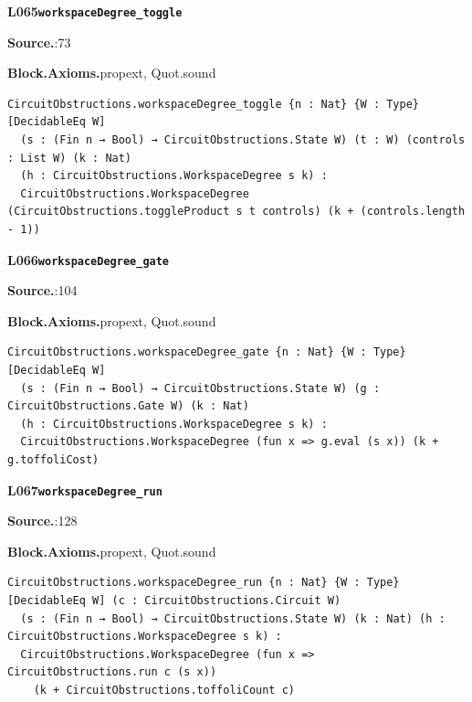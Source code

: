\par\medskip\noindent\begin{minipage}{\textwidth}
{\small\bfseries L065\enspace\texttt{workspaceDegree\_toggle}\par}
{\footnotesize\raggedright\textbf{Source.}\enspace{}:73\par
\textbf{Block.}\quad\textbf{Axioms.}\enspace propext, Quot.sound\par}\nopagebreak
\begin{lstlisting}
CircuitObstructions.workspaceDegree_toggle {n : Nat} {W : Type} [DecidableEq W]
  (s : (Fin n → Bool) → CircuitObstructions.State W) (t : W) (controls : List W) (k : Nat)
  (h : CircuitObstructions.WorkspaceDegree s k) :
  CircuitObstructions.WorkspaceDegree (CircuitObstructions.toggleProduct s t controls) (k + (controls.length - 1))
\end{lstlisting}
\end{minipage}\par

\par\medskip\noindent\begin{minipage}{\textwidth}
{\small\bfseries L066\enspace\texttt{workspaceDegree\_gate}\par}
{\footnotesize\raggedright\textbf{Source.}\enspace{}:104\par
\textbf{Block.}\quad\textbf{Axioms.}\enspace propext, Quot.sound\par}\nopagebreak
\begin{lstlisting}
CircuitObstructions.workspaceDegree_gate {n : Nat} {W : Type} [DecidableEq W]
  (s : (Fin n → Bool) → CircuitObstructions.State W) (g : CircuitObstructions.Gate W) (k : Nat)
  (h : CircuitObstructions.WorkspaceDegree s k) :
  CircuitObstructions.WorkspaceDegree (fun x => g.eval (s x)) (k + g.toffoliCost)
\end{lstlisting}
\end{minipage}\par

\par\medskip\noindent\begin{minipage}{\textwidth}
{\small\bfseries L067\enspace\texttt{workspaceDegree\_run}\par}
{\footnotesize\raggedright\textbf{Source.}\enspace{}:128\par
\textbf{Block.}\quad\textbf{Axioms.}\enspace propext, Quot.sound\par}\nopagebreak
\begin{lstlisting}
CircuitObstructions.workspaceDegree_run {n : Nat} {W : Type} [DecidableEq W] (c : CircuitObstructions.Circuit W)
  (s : (Fin n → Bool) → CircuitObstructions.State W) (k : Nat) (h : CircuitObstructions.WorkspaceDegree s k) :
  CircuitObstructions.WorkspaceDegree (fun x => CircuitObstructions.run c (s x))
    (k + CircuitObstructions.toffoliCount c)
\end{lstlisting}
\end{minipage}\par

